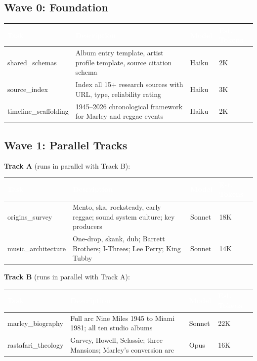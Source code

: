\documentclass[11pt,letterpaper]{article}
\newcommand{\tableheader}[1]{\textbf{\sffamily\textcolor{white}{#1}}}
\begin{document}
\subsection{Wave 0: Foundation}

\begin{center}
\begin{tabularx}{\textwidth}{L{3.5cm}XC{1.5cm}C{2cm}}
\toprule
{}
\tableheader{Task} & \tableheader{Description} & \tableheader{Model} & \tableheader{Est. Tokens} \\
\midrule
shared\_schemas & Album entry template, artist profile template, source citation schema & Haiku & 2K \\
source\_index & Index all 15+ research sources with URL, type, reliability rating & Haiku & 3K \\
timeline\_scaffolding & 1945--2026 chronological framework for Marley and reggae events & Haiku & 2K \\
\bottomrule
\end{tabularx}
\end{center}

\subsection{Wave 1: Parallel Tracks}

\textbf{Track A} (runs in parallel with Track B):

\begin{center}
\begin{tabularx}{\textwidth}{L{3.5cm}XC{1.5cm}C{2cm}}
\toprule
{}
\tableheader{Task} & \tableheader{Description} & \tableheader{Model} & \tableheader{Est. Tokens} \\
\midrule
origins\_survey & Mento, ska, rocksteady, early reggae; sound system culture; key producers & Sonnet & 18K \\
music\_architecture & One-drop, skank, dub; Barrett Brothers; I-Threes; Lee Perry; King Tubby & Sonnet & 14K \\
\bottomrule
\end{tabularx}
\end{center}

\textbf{Track B} (runs in parallel with Track A):

\begin{center}
\begin{tabularx}{\textwidth}{L{3.5cm}XC{1.5cm}C{2cm}}
\toprule
{}
\tableheader{Task} & \tableheader{Description} & \tableheader{Model} & \tableheader{Est. Tokens} \\
\midrule
marley\_biography & Full arc Nine Miles 1945 to Miami 1981; all ten studio albums & Sonnet & 22K \\
rastafari\_theology & Garvey, Howell, Selassie; three Mansions; Marley's conversion arc & Opus & 16K \\
\bottomrule
\end{tabularx}
\end{center}
\end{document}
